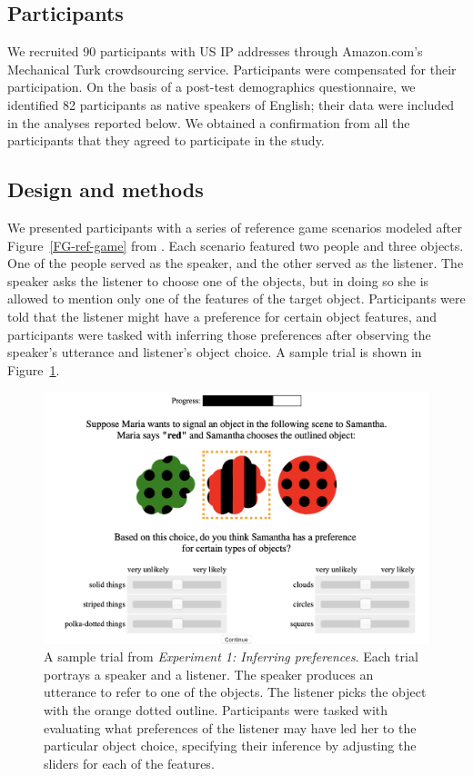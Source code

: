 \documentclass[11pt,a4paper]{article}
\begin{document}
\subsection{Participants}

We recruited 90 participants with US IP addresses through Amazon.com's Mechanical Turk crowdsourcing service. Participants were compensated for their participation. On the basis of a post-test demographics questionnaire, we identified 82 participants as native speakers of English; their data were included in the analyses reported below. We obtained a confirmation from all the participants that they agreed to participate in the study.

\subsection{Design and methods}

We presented participants with a series of reference game scenarios modeled after Figure~\ref{FG-ref-game} from .
Each scenario featured two people and three objects.
One of the people served as the speaker, and the other served as the listener. The speaker asks the listener to choose one of the objects, but in doing so she is allowed to mention only one of the features of the target object. Participants were told that the listener might have a preference for certain object features, and participants were tasked with inferring those preferences after observing the speaker's utterance and listener's object choice. A sample trial is shown in Figure~\ref{exp1-trial}.

\begin{figure}[ht]
	\centering
	\includegraphics[width=4.5in]{images/preference-trial.png}
	\caption{ \small{A sample trial from \emph{Experiment 1: Inferring preferences}. Each trial portrays a speaker and a listener. The speaker produces an utterance to refer to one of the objects. The listener picks the object with the orange dotted outline. Participants were tasked with evaluating what preferences of the listener may have led her to the particular object choice, specifying their inference by adjusting the sliders for each of the features}.}
	\label{exp1-trial}
\end{figure}
\end{document}
